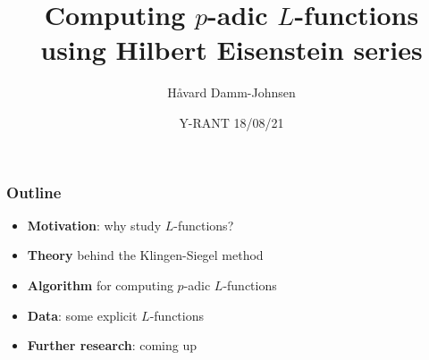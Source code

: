 \documentclass[10pt]{beamer}
\begin{document}
\title{Computing $p$-adic $L$-functions \\ \normalsize using Hilbert Eisenstein series}
\author{Håvard Damm-Johnsen}
\date{Y-RANT 18/08/21}

\maketitle
\begin{frame}
  \frametitle{Outline}

  \begin{itemize}[itemsep=5pt]
  \item \textbf{Motivation}: why study $L$-functions? 
    
  \item \textbf{Theory} behind the Klingen-Siegel method

  \item \textbf{Algorithm} for computing $p$-adic $L$-functions

  \item \textbf{Data}: some explicit $L$-functions 

  \item \textbf{Further research}: coming up
    
  \end{itemize}

  
\end{frame}
\end{document}
